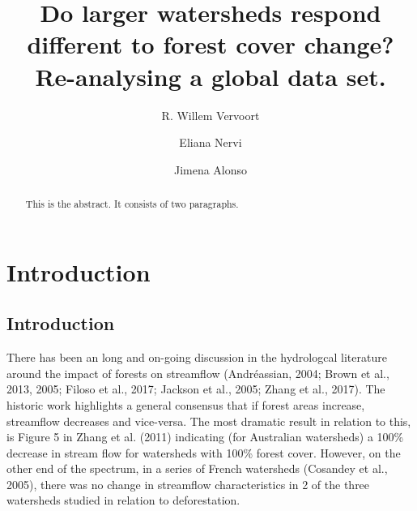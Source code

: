 \documentclass[]{elsarticle} %
\begin{document}
\begin{frontmatter}

  \title{Do larger watersheds respond different to forest cover change?
Re-analysing a global data set.}
    \author[The University of Sydney, INIA]{R. Willem Vervoort}
    \author[INIA]{Eliana Nervi}
    \author[IMFIA]{Jimena Alonso}
      \address[The University of Sydney]{School of Life and Environmental Sciences, The University of Sydney,
Sydney, NSW 2006, Australia}
    \address[INIA]{Instituto Nacional de Investigación Agropecuaria, INIA-Uruguay, Ruta 48
km 10, Rincon del Colorado, 90100 Canelones, Uruguay}
    \address[IMFIA]{Institute of Fluid Mechanics and Environmental Engineering, School of
Engineering, Universidad de la República, 11200 Montevideo, Uruguay}
  
  \begin{abstract}
  This is the abstract. It consists of two paragraphs.
  \end{abstract}
  
 \end{frontmatter}

\hypertarget{introduction}{%
\section{Introduction}\label{introduction}}

\hypertarget{introduction-1}{%
\subsection{Introduction}\label{introduction-1}}

There has been an long and on-going discussion in the hydrologcal
literature around the impact of forests on streamflow (Andréassian,
2004; Brown et al., 2013, 2005; Filoso et al., 2017; Jackson et al.,
2005; Zhang et al., 2017). The historic work highlights a general
consensus that if forest areas increase, streamflow decreases and
vice-versa. The most dramatic result in relation to this, is Figure 5 in
Zhang et al. (2011) indicating (for Australian watersheds) a 100\%
decrease in stream flow for watersheds with 100\% forest cover. However,
on the other end of the spectrum, in a series of French watersheds
(Cosandey et al., 2005), there was no change in streamflow
characteristics in 2 of the three watersheds studied in relation to
deforestation.
\end{document}
